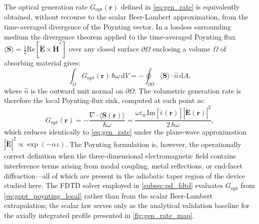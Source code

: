 The optical generation rate $G_{\mathrm{opt}}(\mathbf{r})$ defined in
\cref{eq:gen_rate} is equivalently obtained, without recourse to the scalar
Beer-Lambert approximation, from the time-averaged divergence of the Poynting
vector. In a lossless surrounding medium the divergence theorem applied to the
time-averaged Poynting flux $\langle\mathbf{S}\rangle = \tfrac{1}{2}
\mathrm{Re}[\tilde{\mathbf{E}}\times\tilde{\mathbf{H}}^{*}]$ over any closed
surface $\partial\Omega$ enclosing a volume $\Omega$ of absorbing material
gives:
\begin{equation}
    \int_\Omega G_{\mathrm{opt}}(\mathbf{r})\,\hbar\omega\,\mathrm{d}V
    = -\oint_{\partial\Omega}
      \langle\mathbf{S}\rangle\cdot\hat{n}\,\mathrm{d}A,
    \label{eq:gopt_poynting}
\end{equation}
where $\hat{n}$ is the outward unit normal on $\partial\Omega$. The volumetric
generation rate is therefore the local Poynting-flux sink, computed at each
point as:
\begin{equation}
    G_{\mathrm{opt}}(\mathbf{r})
    = -\frac{\nabla\cdot\langle\mathbf{S}(\mathbf{r})\rangle}{\hbar\omega}
    = \frac{\omega\varepsilon_0\,\mathrm{Im}[\tilde{\varepsilon}(\mathbf{r})]
           |\tilde{\mathbf{E}}(\mathbf{r})|^2}{2\,\hbar\omega},
    \label{eq:gopt_poynting_local}
\end{equation}
which reduces identically to \cref{eq:gen_rate} under the plane-wave
approximation $|\tilde{\mathbf{E}}|^2 \propto \exp(-\alpha z)$. The Poynting
formulation is, however, the operationally correct definition when the
three-dimensional electromagnetic field contains interference terms arising
from modal coupling, metal reflections, or end-facet diffraction—all of which
are present in the adiabatic taper region of the device studied here. The FDTD
solver employed in \cref{subsec:pd_fdtd} evaluates $G_{\mathrm{opt}}$ from
\cref{eq:gopt_poynting_local} rather than from the scalar Beer-Lambert
extrapolation; the scalar law serves only as the analytical validation baseline
for the axially integrated profile presented in \cref{fig:gen_rate_map}.



